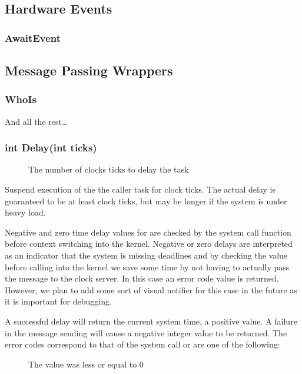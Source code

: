 \documentclass[pdftex,10pt,a4paper]{article}
\begin{document}
\subsection*{Hardware Events}

\subsubsection*{AwaitEvent}

\subsection*{Message Passing Wrappers}

\subsubsection*{WhoIs}

And all the rest\ldots


\subsubsection*{int Delay(int ticks)}

\begin{description}
\item[] The number of clocks ticks to delay the task
\end{description}

Suspend execution of the the caller task for  clock
ticks. The actual delay is guaranteed to be at least  clock
ticks, but may be longer if the system is under heavy load.

Negative and zero time delay values for  are checked by the
system call function before context switching into the
kernel. Negative or zero delays are interpreted as an indicator that
the system is missing deadlines and by checking the value before
calling into the kernel we save some time by not having to actually
pass the message to the clock server. In this case an error code value
is returned. However, we plan to add some sort of visual notifier
for this case in the future as it is important for debugging.

A successful delay will return the current system time, a positive
value. A failure in the message sending will cause a negative integer
value to be returned. The error codes correspond to that of the
 system call or are one of the following:

\begin{description}
\item[] The  value was less or
  equal to $0$
\end{description}
\end{document}
